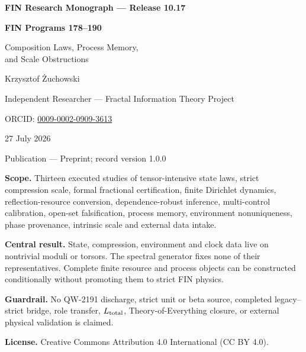 \documentclass[11pt,a4paper,openany]{report}
\begin{document}
\hypersetup{pageanchor=false}
\begin{titlepage}
\centering
\vspace*{8mm}
{\Large\bfseries FIN Research Monograph --- Release 10.17\par}
\vspace{10mm}
{\Huge\bfseries FIN Programs 178--190\par}
\vspace{6mm}
{\Large Composition Laws, Process Memory,\\
and Scale Obstructions\par}
\vspace{16mm}
{\Large Krzysztof \.Zuchowski\par}
\vspace{2mm}
{\normalsize Independent Researcher --- Fractal Information Theory Project\par}
\vspace{2mm}
{\normalsize ORCID: \href{https://orcid.org/0009-0002-0909-3613}{0009-0002-0909-3613}\par}
\vspace{10mm}
{\large 27 July 2026\par}
{\normalsize Publication --- Preprint; record version 1.0.0\par}
\vfill
\begin{minipage}{0.88\textwidth}
\small
\textbf{Scope.} Thirteen executed studies of tensor-intensive state laws,
strict compression scale, formal fractional certification, finite Dirichlet
dynamics, reflection-resource conversion, dependence-robust inference,
multi-control calibration, open-set falsification, process memory,
environment nonuniqueness, phase provenance, intrinsic scale and external
data intake.

\medskip
\textbf{Central result.} State, compression, environment and clock data live
on nontrivial moduli or torsors.  The spectral generator fixes none of their
representatives.  Complete finite resource and process objects can be
constructed conditionally without promoting them to strict FIN physics.

\medskip
\textbf{Guardrail.} No QW-2191 discharge, strict unit or beta source,
completed legacy--strict bridge, role transfer, \(L_{\rm total}\),
Theory-of-Everything closure, or external physical validation is claimed.

\medskip
\textbf{License.} Creative Commons Attribution 4.0 International (CC BY 4.0).
\end{minipage}
\vfill
\end{titlepage}
\hypersetup{pageanchor=true}
\end{document}
